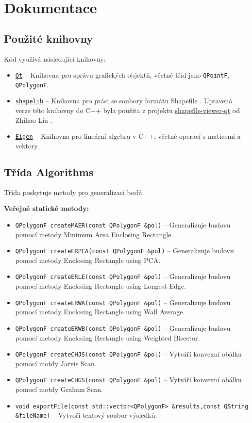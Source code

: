 \section{Dokumentace}

\subsection{Použité knihovny}
Kód využívá následující knihovny:
\begin{itemize}
\item \texttt{\href{https://www.qt.io/}{Qt}} – Knihovna pro správu grafických objektů, včetně tříd jako \texttt{QPointF}, \texttt{QPolygonF}.
\item \texttt{\href{http://shapelib.maptools.org/}{shapelib}} – Knihovna pro práci se soubory formátu Shapefile \cite{shapelib}. Upravená verze této knihovny do C++ byla použita z projektu \href{https://github.com/zhihao-liu/shapefile-viewer-qt/tree/master/shapelib}{shapefile-viewer-qt} od Zhihao Liu \cite{liu2025shapelib}.
\item \texttt{\href{https://gitlab.com/libeigen/eigen}{Eigen}} – Knihovna pro lineární algebru v C++, včetně operací s maticemi a vektory\cite{eigen}.
\end{itemize}

\subsection{Třída Algorithms}
Třída poskytuje metody pro generalizaci bodů

\textbf{Veřejné statické metody:}
\begin{itemize}
\item \texttt{QPolygonF createMAER(const QPolygonF \&pol)} – Generalizuje budovu pomocí metody Minimum Area Enclosing Rectangle.
\item \texttt{QPolygonF createERPCA(const QPolygonF \&pol)} – Generalizuje budovu pomocí metody Enclosing Rectangle using PCA.
\item \texttt{QPolygonF createERLE(const QPolygonF \&pol)} – Generalizuje budovu pomocí metody Enclosing Rectangle using Longest Edge.
\item \texttt{QPolygonF createERWA(const QPolygonF \&pol)} – Generalizuje budovu pomocí metody Enclosing Rectangle using Wall Average.
\item \texttt{QPolygonF createERWB(const QPolygonF \&pol)} – Generalizuje budovu pomocí metody Enclosing Rectangle using Weighted Bisector.
\item \texttt{QPolygonF createCHJS(const QPolygonF \&pol)} – Vytváří konvexní obálku pomocí motdy Jarvis Scan.
\item \texttt{QPolygonF createCHGS(const QPolygonF \&pol)} – Vytváří konvexní obálku pomocí motdy Graham Scan.
\item \texttt{void exportFile(const std::vector<QPolygonF> \&results,const QString \&fileName)} – Vytvoří textový soubor výsledků.
\end{itemize}

